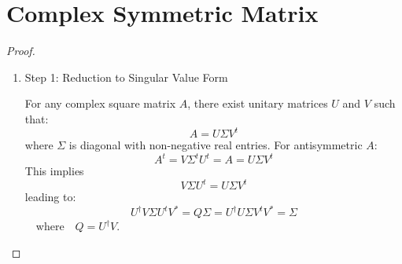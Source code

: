 \section{Complex Symmetric Matrix}

\begin{theorem}
\begin{proof}
\begin{enumerate}
\item Step 1: Reduction to Singular Value Form

For any complex square matrix $A$, there exist unitary matrices $U$ and $V$
such that: 
\begin{equation}
A=U\Sigma V^{t}
\end{equation}%
where $\Sigma $ is diagonal with non-negative real entries. For
antisymmetric $A$: 
\begin{equation}
A^{t}=V\Sigma ^{t}U^{t}=A=U\Sigma V^{t}
\end{equation}%
This implies 
\begin{equation}
V\Sigma U^{t}=U\Sigma V^{t}
\end{equation}%
leading to: 
\begin{equation}
U^{\dagger }V\Sigma U^{t}V^{\ast }=Q\Sigma =U^{\dagger }U\Sigma V^{t}V^{\ast
}=\Sigma 
\end{equation}%
$\quad $where$\quad Q=U^{\dagger }V.$
\end{enumerate}
\end{proof}
\end{theorem}
